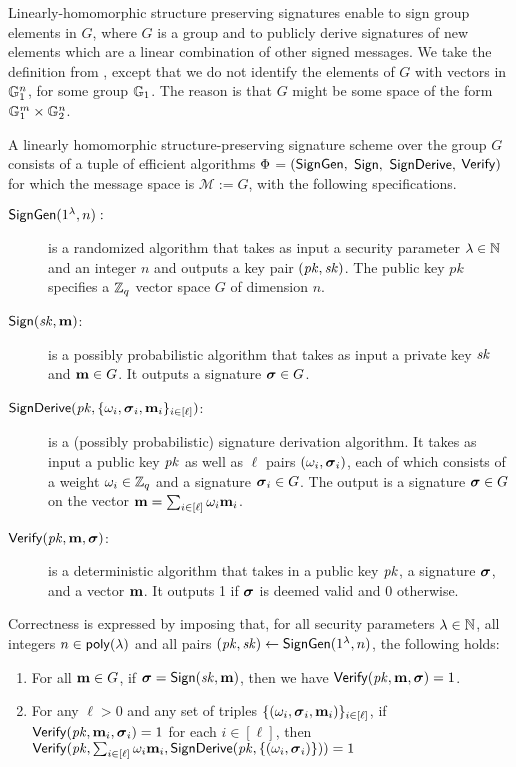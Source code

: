 \label{def:splh}
Linearly-homomorphic structure preserving signatures  \cite{C:AFGHO10,PKC:BFKW09} enable to sign group elements 
in $G$, where $G$ is a group and to publicly derive signatures of new elements which are a linear combination of other signed messages. We take the definition from \cite{C:LPJY13}, except that we do not identify the elements of $G$ with vectors in $\mathbb{G}_1^n$, for some group $\mathbb{G}_1$. The reason is that $G$ might be some space of the form $\mathbb{G}_1^m \times \mathbb{G}_2^n$. 

\begin{definition}
A linearly homomorphic structure-preserving signature scheme over the group $G$  consists
of a tuple of efficient algorithms $\Phi$$=$$(\mathsf{SignGen},$ $\mathsf{Sign},$ $\mathsf{SignDerive},$ $\mathsf{Verify})$ for which the message space
is $\mathcal{M} := G$, with the following specifications.

\begin{description}

\item[$\mathsf{SignGen}(1^\lambda, n):$] is a randomized algorithm that takes as input a security parameter $\lambda\in\mathbb{N}$ and an integer $n$ and  outputs a key pair $(\mathit{pk}, \mathit{sk})$. The public key $pk$ specifies a $\mathbb{Z}_q$ vector space $G$ of dimension $n$. 

\item[$\mathsf{Sign}(\mathit{sk},\mathbf{m})$:] is a possibly probabilistic algorithm that takes as input a private key $\mathit{sk}$
 and $\mathbf{m}\in G$. It outputs a signature ${\boldsymbol \sigma}\in G$.

\item[$\mathsf{SignDerive}(\mathit{pk},\{\omega_i,{\boldsymbol \sigma}_i,\mathbf{m}_i \}_{i\in[\ell]})$:] is a (possibly probabilistic) signature derivation algorithm. It
takes as input a public key $\mathit{pk}$ as well as $\ell$ pairs $(\omega_i,{\boldsymbol \sigma}_i)$, each of which
consists of a weight $\omega_i\in\mathbb{Z}_q$ and a signature ${\boldsymbol \sigma_i}\in G$. The output is a signature
${\boldsymbol \sigma}\in G$ on the vector $\mathbf{m} = \sum_{i\in[\ell]} \omega_i\mathbf{m}_i $.

\item[$\mathsf{Verify}(\mathit{pk}, \mathbf{m},  {\boldsymbol \sigma})$:] is a deterministic algorithm that takes in a public key $\mathit{pk}$,
a signature ${\boldsymbol \sigma}$, and a vector $\mathbf{m}$. It outputs 1 if ${\boldsymbol \sigma}$ is deemed valid and 0 otherwise.
\end{description}
\end{definition}

Correctness is expressed by imposing that, for all security parameters $\lambda\in\mathbb{N}$, all integers $n\in\mathsf{poly}(\lambda)$
and all pairs $(\mathit{pk},\mathit{sk}) \gets \mathsf{SignGen}(1^\lambda, n)$, the following holds:
\begin{enumerate}
\item For all $\mathbf{m} \in G$, if ${\boldsymbol \sigma} = \mathsf{Sign}(\mathit{sk}, \mathbf{m})$, then we have $\mathsf{Verify}(\mathit{pk}, \mathbf{m}, {\boldsymbol \sigma}) = 1$.
\item For any $\ell > 0$ and any set of triples $\{(\omega_i, {\boldsymbol \sigma}_i, \mathbf{m}_i)\}_{i\in[\ell]}$,
if $\mathsf{Verify}(\mathit{pk}, \mathbf{m}_i, {\boldsymbol \sigma}_i) = 1$ for each $i \in [\ell]$, then
$\mathsf{Verify}(
    \mathit{pk},
    \sum_{i\in[\ell]} \omega_i\mathbf{m}_i,
    \mathsf{SignDerive}(
        \mathit{pk},
        \{(\omega_i, {\boldsymbol \sigma}_i)\}
        )
    )=1
$
\end{enumerate}

